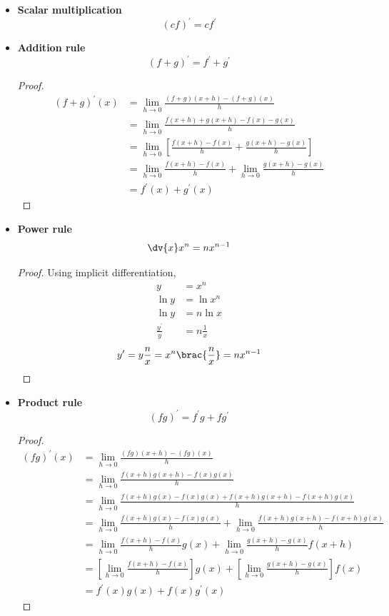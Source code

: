 \begin{itemize}
\item \textbf{Scalar multiplication}
\[ (cf)^\prime = cf^\prime \]

\item \textbf{Addition rule}
\[ (f+g)^\prime = f^\prime + g^\prime \]

\begin{proof}
\begin{align*}
(f + g)^\prime (x) &= \lim_{h \to 0} \frac{(f+g)(x+h) - (f+g)(x)}{h}\\
&= \lim_{h \to 0} \frac{f(x+h) + g(x+h) - f(x) - g(x)}{h}\\
&= \lim_{h \to 0} \left[ \frac{f(x+h) - f(x)}{h} + \frac{g(x+h) - g(x)}{h} \right] \\
&= \lim_{h \to 0} \frac{f(x+h) - f(x)}{h} + \lim_{h \to 0} \frac{g(x+h) - g(x)}{h}\\
&= f^\prime (x) + g^\prime (x)
\end{align*}
\end{proof}

\item \textbf{Power rule}
\[ \dv{x} x^n = n x^{n-1} \]

\begin{proof}
Using implicit differentiation,
\begin{align*}
y &= x^n \\
\ln y &= \ln x^n \\
\ln y &= n \ln x \\
\frac{y^\prime}{y} &= n \frac{1}{x}
\end{align*}
\[ y^\prime = y \frac{n}{x} = x^n \brac{\frac{n}{x}} = n x^{n-1} \]
\end{proof}

\item \textbf{Product rule}
\[ (fg)^\prime = f^\prime g + f g^\prime \]

\begin{proof}
\begin{align*}
(fg)^\prime (x) &= \lim_{h \to 0} \frac{(fg)(x+h) - (fg)(x)}{h}\\
&= \lim_{h \to 0} \frac{f(x+h) g(x+h) - f(x) g(x)}{h}\\
&= \lim_{h \to 0} \frac{f(x+h) g(x) - f(x) g(x) + f(x+h) g(x+h) - f(x+h) g(x)}{h}\\
&= \lim_{h \to 0} \frac{f(x+h) g(x) - f(x) g(x)}{h} + \lim_{h \to 0} \frac{f(x+h) g(x+h) - f(x+h) g(x)}{h}\\
&= \lim_{h \to 0} \frac{f(x+h) - f(x)}{h}g(x) + \lim_{h \to 0} \frac{g(x+h) - g(x)}{h}f(x+h)\\
&= \left[\lim_{h \to 0} \frac{f(x+h) - f(x)}{h}\right] g(x) + \left[\lim_{h \to 0} \frac{g(x+h) - g(x)}{h}\right] f(x)\\
&= f^\prime (x) g(x) + f(x) g^\prime (x)
\end{align*}
\end{proof}


\end{itemize}

